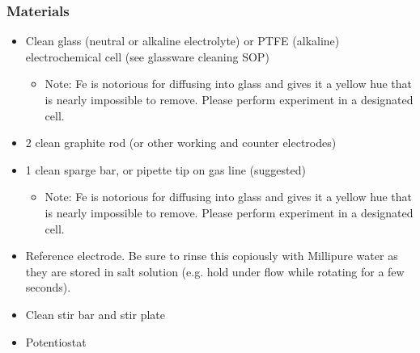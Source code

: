 \documentclass{article}
\begin{document}
\subsubsection*{Materials}
\begin{itemize}
\item Clean glass (neutral or alkaline electrolyte) or PTFE (alkaline) electrochemical cell (see glassware cleaning SOP)
\begin{itemize}
\item Note: Fe is notorious for diffusing into glass and gives it a yellow hue that is nearly impossible to remove. Please perform experiment in a designated cell.
\end{itemize}
\item 2 clean graphite rod (or other working and counter electrodes)
\item 1 clean sparge bar, or pipette tip on gas line (suggested)
\begin{itemize}
\item Note: Fe is notorious for diffusing into glass and gives it a yellow hue that is nearly impossible to remove. Please perform experiment in a designated cell.
\end{itemize}
\item Reference electrode. Be sure to rinse this copiously with Millipure water as they are stored in salt solution (e.g. hold under flow while rotating for a few seconds).
\item Clean stir bar and stir plate
\item Potentiostat
\end{itemize}
\end{document}
